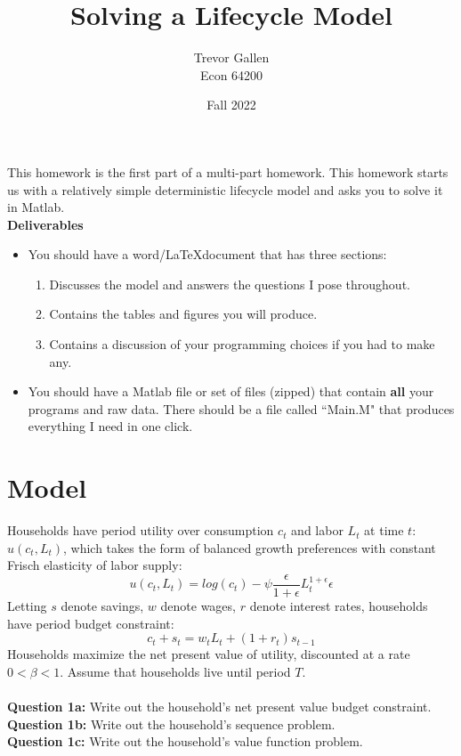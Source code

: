 \documentclass[11pt]{article}
\title{Solving a Lifecycle Model}
\author{ Trevor Gallen \\ Econ 64200 }
\date{Fall 2022}
\begin{document}


\maketitle

This homework is the first part of a multi-part homework.  This homework starts us with a relatively simple deterministic lifecycle model and asks you to solve it in Matlab.\\

\textbf{Deliverables}
\begin{itemize}
\item You should have a word/\LaTeX document that has three sections: 
\begin{enumerate}
\item Discusses the model and answers the questions I pose throughout.
\item Contains the tables and figures you will produce.
\item Contains a discussion of your programming choices if you had to make any.
\end{enumerate}
\item You should have a Matlab file or set of files (zipped) that contain \textbf{all} your programs and raw data.  There should be a file called ``Main.M" that produces everything I need in one click.
\end{itemize}


\section{Model}
Households have period utility over consumption $c_t$ and labor $L_t$ at time $t$: $u(c_t,L_t)$, which takes the form of balanced growth preferences with constant Frisch elasticity of labor supply:
$$u(c_t,L_t)=log(c_t)-\psi \frac{\epsilon}{1+\epsilon}L_t^{1+\epsilon}{\epsilon}$$
Letting $s$ denote savings, $w$ denote wages, $r$ denote interest rates, households have period budget constraint:
$$c_t+s_t=w_tL_t+(1+r_t)s_{t-1}$$
Households maximize the net present value of utility, discounted at a rate $0<\beta<1$. Assume that households live until period $T$.\\
\ \\
\textbf{Question 1a:} Write out the household's net present value budget constraint.\\
\textbf{Question 1b:} Write out the household's sequence problem.\\
\textbf{Question 1c:} Write out the household's value function problem.\\
\end{document}
